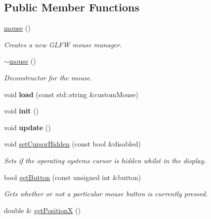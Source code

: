 \subsection*{Public Member Functions}
\begin{DoxyCompactItemize}
\item 
\hyperlink{classflounder_1_1mouse_a60e59355a55844e8ca559e2f6b9c82e9}{mouse} ()
\begin{DoxyCompactList}\small\item\em Creates a new G\+L\+FW mouse manager. \end{DoxyCompactList}\item 
\hyperlink{classflounder_1_1mouse_a3038f39f358e37d15059af6c1675497b}{$\sim$mouse} ()
\begin{DoxyCompactList}\small\item\em Deconstructor for the mouse. \end{DoxyCompactList}\item 
\mbox{\label{classflounder_1_1mouse_af88cf24fffafeb3e6ed1db19ec40698c}} 
void {\bfseries load} (const std\+::string \&custom\+Mouse)
\item 
\mbox{\label{classflounder_1_1mouse_a3fd2b12c02a2468e246a81da19d3040a}} 
void {\bfseries init} ()
\item 
\mbox{\label{classflounder_1_1mouse_a42b9afbf11bf6e3bed1fe6ae4508bca0}} 
void {\bfseries update} ()
\item 
void \hyperlink{classflounder_1_1mouse_aff9750c7d68e93aea4c2d3c447677a9e}{set\+Cursor\+Hidden} (const bool \&disabled)
\begin{DoxyCompactList}\small\item\em Sets if the operating systems cursor is hidden whilst in the display. \end{DoxyCompactList}\item 
bool \hyperlink{classflounder_1_1mouse_afa21b270438542e8d77133156a1a43c9}{get\+Button} (const unsigned int \&button)
\begin{DoxyCompactList}\small\item\em Gets whether or not a particular mouse button is currently pressed. \end{DoxyCompactList}\item 
double \& \hyperlink{classflounder_1_1mouse_a2e442682cc73d6bcb2be7702c17d1dff}{get\+PositionX} ()

\end{DoxyCompactItemize}
